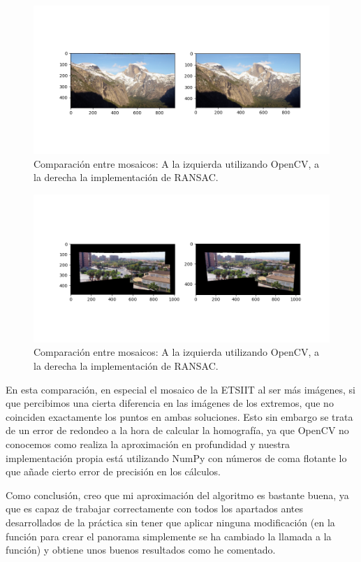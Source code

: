 \documentclass[12pt, spanish]{article}
\begin{document}
\begin{figure}[H]
  \centering
      \includegraphics[width=\textwidth]{cmp_ransac_cv_propio.png}
 		\caption{Comparación entre mosaicos: A la izquierda utilizando OpenCV, a la derecha la implementación de RANSAC.}
\end{figure}

\begin{figure}[H]
  \centering
      \includegraphics[width=\textwidth]{cmp_ransac_cv_propio_etsiit.png}
 		\caption{Comparación entre mosaicos: A la izquierda utilizando OpenCV, a la derecha la implementación de RANSAC.}
\end{figure}


En esta comparación, en especial el mosaico de la ETSIIT al ser más imágenes, si que percibimos una cierta diferencia en las imágenes de los extremos, que no coinciden exactamente los puntos en ambas soluciones. Esto sin embargo se trata de un error de redondeo a la hora de calcular la homografía, ya que OpenCV no conocemos como realiza la aproximación en profundidad y nuestra implementación propia está utilizando NumPy con números de coma flotante lo que añade cierto error de precisión en los cálculos.

Como conclusión, creo que mi aproximación del algoritmo es bastante buena, ya que es capaz de trabajar correctamente con todos los apartados antes desarrollados de la práctica sin tener que aplicar ninguna modificación (en la función para crear el panorama simplemente se ha cambiado la llamada a la función) y obtiene unos buenos resultados como he comentado.
\end{document}
